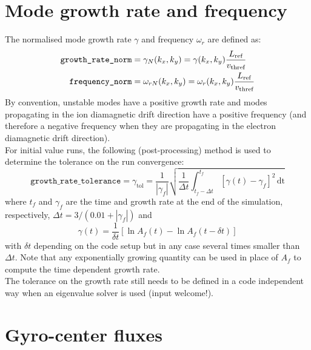 \documentclass[a4paper]{report}
\begin{document}
\section{Mode growth rate and frequency} \label{sec:eigenvalues}
The normalised mode growth rate $\gamma$ and frequency $\omega_r$ are defined as:
\begin{align*}
 \texttt{growth\_rate\_norm}&=\gamma_N(k_x,k_y) = \gamma(k_x,k_y) \frac{L_{\textrm{ref}}}{v_\textrm{thref}}\\
 \texttt{frequency\_norm}&=\omega_{rN}(k_x,k_y) = \omega_r(k_x,k_y) \frac{L_{\textrm{ref}}}{v_\textrm{thref}}
\end{align*}
By convention, unstable modes have a positive growth rate and modes propagating in the ion diamagnetic drift direction have a positive frequency (and therefore a negative frequency when they are propagating in the electron diamagnetic drift direction).\\
For initial value runs, the following (post-processing) method is used to determine the tolerance on the run convergence:
$$\texttt{growth\_rate\_tolerance}=\gamma_\textrm{tol} = \frac{1}{|\gamma_f|}\sqrt{\frac{1}{\Delta t}\int_{t_f-\Delta t}^{t_f} \left[\gamma(t)-\gamma_f\right]^2\,\textrm{dt}}$$
where $t_f$ and $\gamma_f$ are the time and growth rate at the end of the simulation, respectively, $\Delta t = 3/(0.01+|\gamma_f|)$ and
$$\gamma(t)=\frac{1}{\delta t}[\ln{A_f(t)}-\ln{A_f(t-\delta t)}]$$
with $\delta t$ depending on the code setup but in any case several times smaller than $\Delta t$. Note that any exponentially growing quantity can be used in place of $A_f$ to compute the time dependent growth rate.\\
The tolerance on the growth rate still needs to be defined in a code independent way when an eigenvalue solver is used (input welcome!).



\section{Gyro-center fluxes} \label{sec:fluxes}
\end{document}
